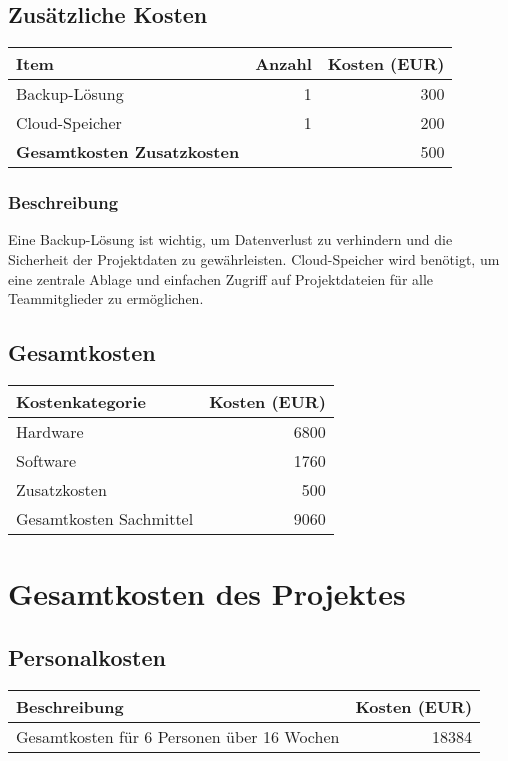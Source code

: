 \subsection*{Zusätzliche Kosten}
\begin{tabular}{lrr}
  \toprule
  \textbf{Item} & \textbf{Anzahl} & \textbf{Kosten (EUR)} \\
  \midrule
  Backup-Lösung & 1 & 300 \\
  Cloud-Speicher & 1 & 200 \\
  \midrule
  \textbf{Gesamtkosten Zusatzkosten} & & 500 \\
  \bottomrule
\end{tabular}

\subsubsection*{Beschreibung}
Eine Backup-Lösung ist wichtig, um Datenverlust zu verhindern und die Sicherheit der Projektdaten zu gewährleisten. Cloud-Speicher wird benötigt, um eine zentrale Ablage und einfachen Zugriff auf Projektdateien für alle Teammitglieder zu ermöglichen.

\subsection*{Gesamtkosten}
\begin{tabular}{lr}
  \toprule
  \textbf{Kostenkategorie} & \textbf{Kosten (EUR)} \\
  \midrule
  Hardware & 6800 \\
  Software & 1760 \\
  Zusatzkosten & 500 \\
  \midrule
  Gesamtkosten Sachmittel & 9060 \\
  \bottomrule
\end{tabular}

\section*{Gesamtkosten des Projektes}

\subsection*{Personalkosten}
\begin{tabular}{lr}
  \toprule
  \textbf{Beschreibung} & \textbf{Kosten (EUR)} \\
  \midrule
  Gesamtkosten für 6 Personen über 16 Wochen & 18384 \\
  \bottomrule
\end{tabular}

